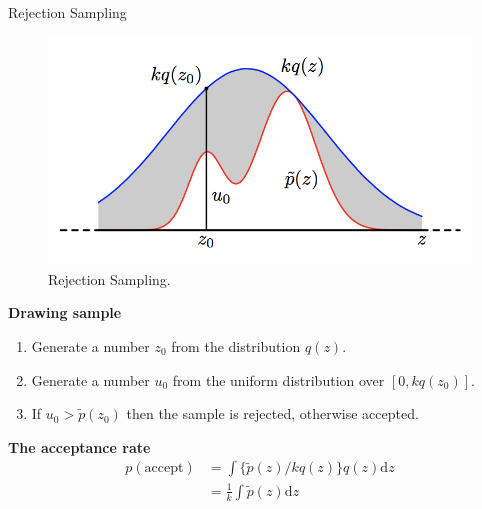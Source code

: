 \documentclass{bredelebeamer}
\begin{document}
\begin{frame}{Rejection Sampling}
  \begin{figure}
  \centering
  \includegraphics[scale=0.35]{rej_sampling.png}
  \caption{
    Rejection Sampling.
  }
  \end{figure}
  \textbf{Drawing sample} \\
  \begin{enumerate}
    \item Generate a number $z_0$ from the distribution $q(z)$.
    \item Generate a number $u_0$ from the uniform distribution over $[0, kq(z_0)]$.
    \item If $u_0 > \tilde{p}(z_0)$ then the sample is rejected, otherwise accepted.
  \end{enumerate}

  \textbf{The acceptance rate}
  \begin{equation}
    \begin{split}
      p(\textrm{accept}) &= \int \{\tilde{p}(z)/kq(z)\} q(z) \mathrm{d}z \\
      &= \frac{1}{k} \int \tilde{p}(z) \mathrm{d}z
    \end{split}
  \end{equation}
\end{frame}
\end{document}
